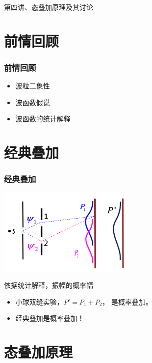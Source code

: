 
\begin{frame}
    \frametitle{}
    \begin{center}
    { {\huge 第四讲、态叠加原理及其讨论}}
    \end{center}    
\end{frame}


\section{前情回顾}

\begin{frame}
    \frametitle{前情回顾}
    \begin{itemize}
        \item 波粒二象性
        \item 波函数假说
        \item 波函数的统计解释
    \end{itemize}
\end{frame}  

\section{经典叠加}

\begin{frame}
    \frametitle{经典叠加}
    \begin{center}
        \includegraphics[width=0.5\textwidth]{figs/sup-2.png} \\
    \end{center} 
    依据统计解释，振幅的概率幅\\
    \begin{itemize}
        \item 小球双缝实验，$P'=P_1+P_2 $， 是概率叠加。
        \item 经典叠加是概率叠加！
    \end{itemize}
\end{frame} 

\section{态叠加原理}

